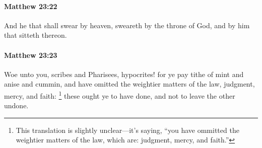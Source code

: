 		\paragraph{Matthew 23:22} %
			\label{MATTHEW-23-22}

			And he that shall swear by heaven, sweareth by the throne of God, and by him that sitteth thereon.

			\begin{framed}
			\scriptsize
				\begin{compactdesc}
					\item[SBLG] 
				\end{compactdesc}
			\end{framed}

		\paragraph{Matthew 23:23} %
			\label{MATTHEW-23-23}

			Woe unto you, scribes and Pharisees, hypocrites! for ye pay tithe of mint and anise and cummin, and have omitted the weightier matters of the law, judgment, mercy, and faith:%
				\footnote{%
					This translation is slightly unclear---it's saying, ``you have ommitted the weightier matters of the law, which are: judgment, mercy, and faith.''
					}
			these ought ye to have done, and not to leave the other undone.

